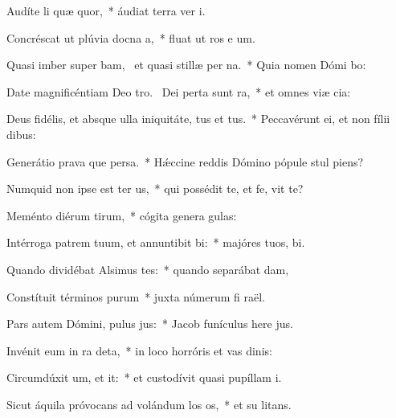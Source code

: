\item Audíte li quæ quor,~* áudiat terra ver  i.
\item Concréscat ut plúvia docna a,~* fluat ut ros e um.
\item Quasi imber super bam,~\pscross{} et quasi stillæ per na.~* Quia nomen Dómi bo:
\item Date magnificéntiam Deo tro.~\pscross{} Dei perta sunt ra,~* et omnes viæ  cia:
\item Deus fidélis, et absque ulla iniquitáte, tus et tus.~* Peccavérunt ei, et non fílii   dibus:
\item Generátio prava que persa.~* Hǽccine reddis Dómino pópule stul  piens?
\item Numquid non ipse est ter us,~* qui possédit te, et fe,  vit te?
\item Meménto diérum tirum,~* cógita genera gulas:
\item Intérroga patrem tuum, et annuntibit bi:~* majóres tuos,   bi.
\item Quando dividébat Alsimus tes:~* quando separábat  dam,
\item Constítuit términos purum~* juxta númerum fi raël.
\item Pars autem Dómini, pulus jus:~* Jacob funículus here jus.
\item Invénit eum in ra deta,~* in loco horróris et vas dinis:
\item Circumdúxit um, et it:~* et custodívit quasi pupíllam  i.
\item Sicut áquila próvocans ad volándum los os,~* et su  litans.

